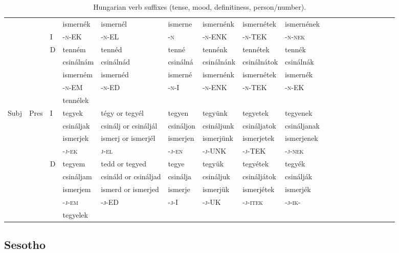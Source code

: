 \documentclass[11pt,letterpaper]{article}
\begin{document}
\begin{table}[]
{\begin{tabular}{lll||llllllllllllllll}
  &&&    ismernék &	ismernél &	ismerne &	ismernénk &	ismernétek &	ismernének \\
  & &   I    &-\textsc{n}-EK &	-\textsc{n}-EL &	-\textsc{n} &	-\textsc{n}-ENK &	-\textsc{n}-TEK &	-\textsc{n}-\textsc{nek} \\\hline
   &&  D    &tenném &	tennéd &	tenné &	tennénk &	tennétek &	tennék \\
   &&       & csinálnám &	csinálnád &	csinálná &	csinálnánk &	csinálnátok &	csinálnák \\
 &&&  ismerném &	ismernéd &	ismerné &	ismernénk 	&ismernétek &	ismernék \\
&&      &-\textsc{n}-EM &	-\textsc{n}-ED &	-\textsc{n}-I &	-\textsc{n}-ENK &	-\textsc{n}-TEK &	-\textsc{n}-EK \\ \hline
       &&  &tennélek \\ \hline
Subj & Pres & I         &tegyek &	tégy or tegyél &	tegyen &	tegyünk &	tegyetek &	tegyenek \\
     &      &           & csináljak &	csinálj or
csináljál &	csináljon &	csináljunk& 	csináljatok &	csináljanak \\
&&&ismerjek &	ismerj or
ismerjél &	ismerjen &	ismerjünk &	ismerjetek &	ismerjenek \\
 &  &          &-\textsc{j}-\textsc{ek} &	\textsc{j}-\textsc{el} &	-\textsc{j}-\textsc{en} &	-\textsc{j}-UNK &	-\textsc{j}-TEK &	-\textsc{j}-\textsc{nek} \\ \hline
&&D         &tegyem &	tedd or tegyed &	tegye &	tegyük& 	tegyétek &	tegyék \\
&&          & csináljam &	csináld or
csináljad &	csinálja &	csináljuk &	csináljátok &	csinálják \\
&&&ismerjem &	ismerd or
ismerjed &	ismerje &	ismerjük &	ismerjétek & ismerjék
 \\
&&         &-\textsc{j}-\textsc{em} &	-\textsc{j}-\textsc{ED} &	-\textsc{j}-I &	-\textsc{j}-UK & 	-\textsc{j}-\textsc{itek} &	-\textsc{j}-\textsc{ik}- \\ \hline
  &&       &tegyelek \\
    \end{tabular}
    }
    \caption{Hungarian verb suffixes (tense, mood, definitiness, person/number).}
    \label{tab:hungarian-paradigms}
\end{table}


\subsection{Sesotho}
\end{document}
